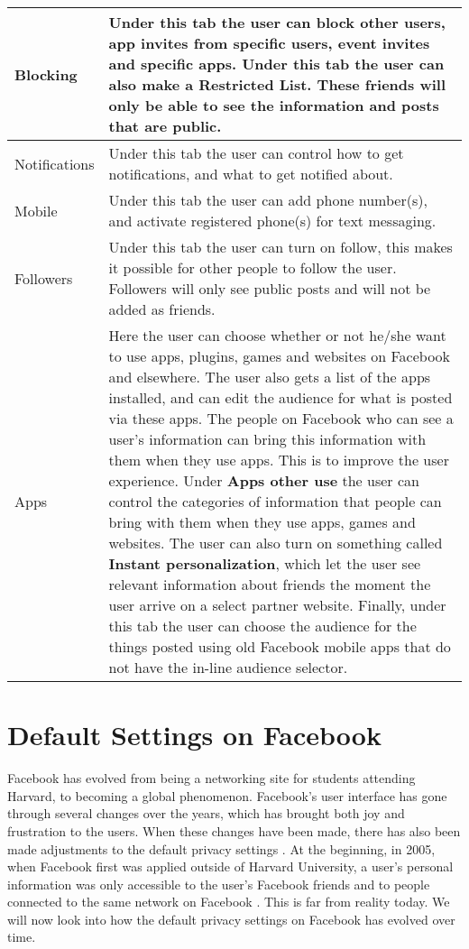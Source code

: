 \begin{center}
\begin{longtable}{ | l | p{9cm} |}
	\hline
    Blocking & Under this tab the user can block other users, app invites from specific users, event invites and specific apps. Under this tab the user can also make a \textbf{Restricted List}. These friends will only be able to see the information and posts that are public.\\
    \hline
    Notifications & Under this tab the user can control how to get notifications, and what to get notified about.\\
    \hline
    Mobile & Under this tab the user can add phone number(s), and activate registered phone(s) for text messaging.\\
    \hline
    Followers & Under this tab the user can turn on follow, this makes it possible for other people to follow the user. Followers will only see public posts and will not be added as friends.\\
    \hline
    Apps & Here the user can choose whether or not he/she want to use apps, plugins, games and websites on Facebook and elsewhere. The user also gets a list of the apps installed, and can edit the audience for what is posted via these apps. The people on Facebook who can see a user's information can bring this information with them when they use apps. This is to improve the user experience. Under \textbf{Apps other use} the user can control the categories of information that people can bring with them when they use apps, games and websites. The user can also turn on something called \textbf{Instant personalization}, which let the user see relevant information about friends the moment the user arrive on a select partner website. Finally, under this tab the user can choose the audience for the things posted using old Facebook mobile apps that do not have the in-line audience selector.\\ 
    \hline
    \end{longtable}
\end{center}



\section{Default Settings on Facebook}\label{sec:default_privacy_settings}

Facebook has evolved from being a networking site for students attending Harvard, to becoming a global phenomenon. Facebook's user interface has gone through several changes over the years, which has brought both joy and frustration to the users. When these changes have been made, there has also been made adjustments to the default privacy settings \cite{EvoPriv2}. At the beginning, in 2005, when Facebook first was applied outside of Harvard University, a user's personal information was only accessible to the user's Facebook friends and to people connected to the same network on Facebook \cite{EvoPriv}. This is far from reality today. We will now look into how the default privacy settings on Facebook has evolved over time. 


